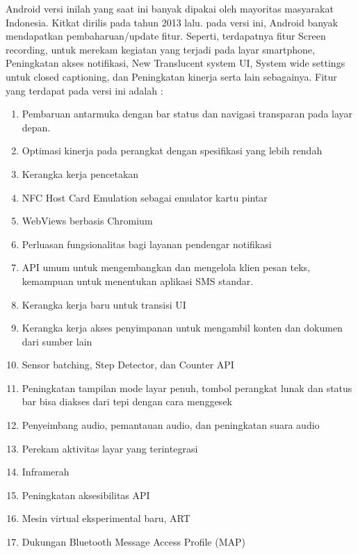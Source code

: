 \begin{enumerate}
Android versi inilah yang saat ini banyak dipakai oleh mayoritas masyarakat Indonesia. Kitkat dirilis pada tahun 2013 lalu. pada versi ini, Android banyak mendapatkan pembaharuan/update fitur. Seperti, terdapatnya fitur Screen recording, untuk merekam kegiatan yang terjadi pada layar smartphone, Peningkatan akses notifikasi, New Translucent system UI, System wide settings untuk closed captioning, dan Peningkatan kinerja serta lain sebagainya. Fitur yang terdapat pada versi ini adalah : 
\begin{enumerate}
    \item Pembaruan antarmuka dengan bar status dan navigasi transparan pada layar depan.
    \item Optimasi kinerja pada perangkat dengan spesifikasi yang lebih rendah
    \item Kerangka kerja pencetakan
    \item NFC Host Card Emulation sebagai emulator kartu pintar
    \item WebViews berbasis Chromium
    \item Perluasan fungsionalitas bagi layanan pendengar notifikasi
    \item API umum untuk mengembangkan dan mengelola klien pesan teks, kemampuan untuk menentukan aplikasi SMS standar.
    \item Kerangka kerja baru untuk transisi UI
    \item Kerangka kerja akses penyimpanan untuk mengambil konten dan dokumen dari sumber lain
    \item Sensor batching, Step Detector, dan Counter API
    \item Peningkatan tampilan mode layar penuh, tombol perangkat lunak dan status bar bisa diakses dari tepi dengan cara menggesek
    \item Penyeimbang audio, pemantauan audio, dan peningkatan suara audio
    \item Perekam aktivitas layar yang terintegrasi
    \item Inframerah
    \item Peningkatan aksesibilitas API
    \item Mesin virtual eksperimental baru, ART
    \item Dukungan Bluetooth Message Access Profile (MAP)
\end{enumerate}


\end{enumerate}
